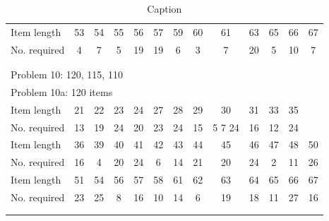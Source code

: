 \documentclass[a4paper]{article}
\begin{document}
\begin{table}[http]
\begin{tabular}{lcccccccccccc}
        Item length & 53 & 54 & 55 & 56 & 57 & 59 & 60 & 61 & 63 & 65 & 66 & 67 \\
        No. required & 4 & 7 & 5 & 19 & 19 & 6 & 3 & 7 & 20 & 5 & 10 & 7 \\
        \\
        \hline
        \\
        \toprule
        \multicolumn{13}{l}{Problem 10: 120, 115, 110} \\
        \multicolumn{13}{l}{Problem 10a: 120 \quad 600 items} \\
        \midrule
        Item length & 21 & 22 & 23 & 24 & 27 & 28 & 29 & 30 & 31 & 33 & 35 \\
        No. required & 13 & 19 & 24 & 20 & 23 & 24 & 15 & 5 7 24 & 16 & 12 & 24 \\
        Item length & 36 & 39 & 40 & 41 & 42 & 43 & 44 & 45 & 46 & 47 & 48 & 50 \\
        No. required & 16 & 4 & 20 & 24 & 6 & 14 & 21 & 20 & 24 & 2 & 11 & 26 \\
        Item length & 51 & 54 & 56 & 57 & 58 & 61 & 62 & 63 & 64 & 65 & 66 & 67 \\
        No. required & 23 & 25 & 8 &16 & 10 & 14 & 6 & 19 & 18 & 11 & 27 & 16 \\
        \toprule
        \\
        \hline
        \\
        \bottomrule
    \end{tabular}    
    \caption{Caption}
    \label{tab:my_label}
\end{table}
\end{document}
